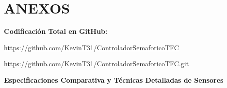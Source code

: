 \documentclass[12pt,a4paper,oneside]{report}
\providecommand{\ul}[1]{\underline{#1}}
\begin{document}
\appendix
\chapter*{ANEXOS}\label{anexos}

\textbf{Codificación Total en GitHub:}

\href{https://github.com/KevinT31/ControladorSemaforicoTFC}{\ul{https://github.com/KevinT31/ControladorSemaforicoTFC}}

https://github.com/KevinT31/ControladorSemaforicoTFC.git

\textbf{Especificaciones Comparativa y Técnicas Detalladas de Sensores}

\label{tbl:4.1}
\end{document}
